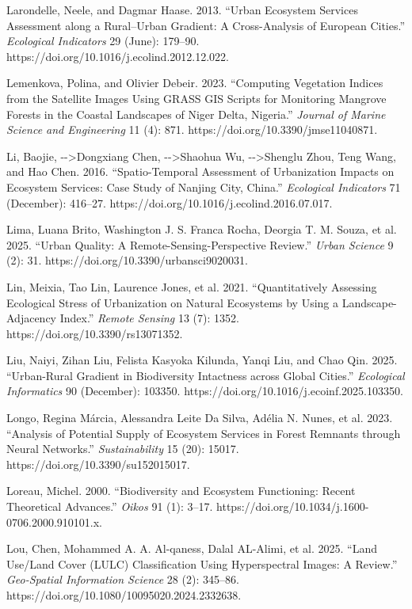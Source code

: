 Larondelle, Neele, and Dagmar Haase. 2013. ``Urban Ecosystem Services Assessment along a Rural--Urban Gradient: A Cross-Analysis of European Cities.'' \emph{Ecological Indicators} 29 (June): 179--90. https://doi.org/10.1016/j.ecolind.2012.12.022.

Lemenkova, Polina, and Olivier Debeir. 2023. ``Computing Vegetation Indices from the Satellite Images Using GRASS GIS Scripts for Monitoring Mangrove Forests in the Coastal Landscapes of Niger Delta, Nigeria.'' \emph{Journal of Marine Science and Engineering} 11 (4): 871. https://doi.org/10.3390/jmse11040871.

Li, Baojie, -\/-\textgreater Dongxiang Chen, -\/-\textgreater Shaohua Wu, -\/-\textgreater Shenglu Zhou, Teng Wang, and Hao Chen. 2016. ``Spatio-Temporal Assessment of Urbanization Impacts on Ecosystem Services: Case Study of Nanjing City, China.'' \emph{Ecological Indicators} 71 (December): 416--27. https://doi.org/10.1016/j.ecolind.2016.07.017.

Lima, Luana Brito, Washington J. S. Franca Rocha, Deorgia T. M. Souza, et al. 2025. ``Urban Quality: A Remote-Sensing-Perspective Review.'' \emph{Urban Science} 9 (2): 31. https://doi.org/10.3390/urbansci9020031.

Lin, Meixia, Tao Lin, Laurence Jones, et al. 2021. ``Quantitatively Assessing Ecological Stress of Urbanization on Natural Ecosystems by Using a Landscape-Adjacency Index.'' \emph{Remote Sensing} 13 (7): 1352. https://doi.org/10.3390/rs13071352.

Liu, Naiyi, Zihan Liu, Felista Kasyoka Kilunda, Yanqi Liu, and Chao Qin. 2025. ``Urban-Rural Gradient in Biodiversity Intactness across Global Cities.'' \emph{Ecological Informatics} 90 (December): 103350. https://doi.org/10.1016/j.ecoinf.2025.103350.

Longo, Regina Márcia, Alessandra Leite Da Silva, Adélia N. Nunes, et al. 2023. ``Analysis of Potential Supply of Ecosystem Services in Forest Remnants through Neural Networks.'' \emph{Sustainability} 15 (20): 15017. https://doi.org/10.3390/su152015017.

Loreau, Michel. 2000. ``Biodiversity and Ecosystem Functioning: Recent Theoretical Advances.'' \emph{Oikos} 91 (1): 3--17. https://doi.org/10.1034/j.1600-0706.2000.910101.x.

Lou, Chen, Mohammed A. A. Al-qaness, Dalal AL-Alimi, et al. 2025. ``Land Use/Land Cover (LULC) Classification Using Hyperspectral Images: A Review.'' \emph{Geo-Spatial Information Science} 28 (2): 345--86. https://doi.org/10.1080/10095020.2024.2332638.

